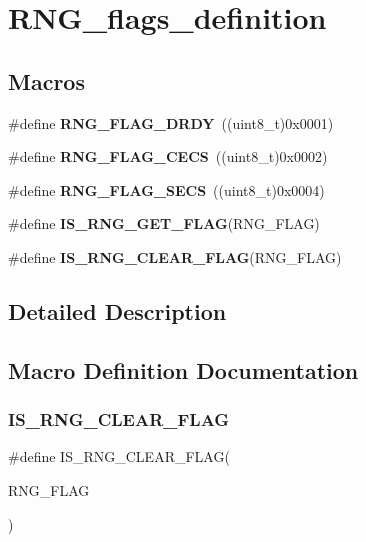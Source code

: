 \section{R\+N\+G\+\_\+flags\+\_\+definition}
\label{group__RNG__flags__definition}
\subsection*{Macros}
\begin{DoxyCompactItemize}
\item 
\#define \textbf{ R\+N\+G\+\_\+\+F\+L\+A\+G\+\_\+\+D\+R\+DY}~((uint8\+\_\+t)0x0001)
\item 
\#define \textbf{ R\+N\+G\+\_\+\+F\+L\+A\+G\+\_\+\+C\+E\+CS}~((uint8\+\_\+t)0x0002)
\item 
\#define \textbf{ R\+N\+G\+\_\+\+F\+L\+A\+G\+\_\+\+S\+E\+CS}~((uint8\+\_\+t)0x0004)
\item 
\#define \textbf{ I\+S\+\_\+\+R\+N\+G\+\_\+\+G\+E\+T\+\_\+\+F\+L\+AG}(R\+N\+G\+\_\+\+F\+L\+AG)
\item 
\#define \textbf{ I\+S\+\_\+\+R\+N\+G\+\_\+\+C\+L\+E\+A\+R\+\_\+\+F\+L\+AG}(R\+N\+G\+\_\+\+F\+L\+AG)
\end{DoxyCompactItemize}


\subsection{Detailed Description}


\subsection{Macro Definition Documentation}
\mbox{\label{group__RNG__flags__definition_gabf70e291bc05206bfccf1ac8ab5bba18}} 
\subsubsection{I\+S\+\_\+\+R\+N\+G\+\_\+\+C\+L\+E\+A\+R\+\_\+\+F\+L\+AG}
{\footnotesize\ttfamily \#define I\+S\+\_\+\+R\+N\+G\+\_\+\+C\+L\+E\+A\+R\+\_\+\+F\+L\+AG(\begin{DoxyParamCaption}\item[{}]{R\+N\+G\+\_\+\+F\+L\+AG }\end{DoxyParamCaption})}

